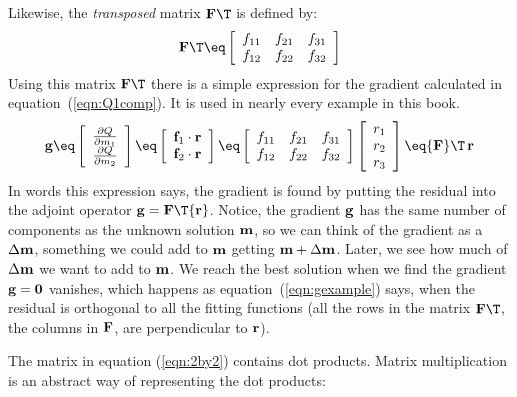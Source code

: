 Likewise, the {\it transposed} matrix $\bold F\T$ is defined by:
\begin{equation}
\bold F\T \eq
\left[ 
\begin{array}{ccc}
  f_{11} & f_{21} & f_{31}  \\
  f_{12} & f_{22} & f_{32}  \end{array} \right] 
\end{equation}
Using this matrix ${\bold F\T}$ there is a simple expression
for the gradient calculated in equation~(\ref{eqn:Q1comp}).
It is used in nearly every example in this book.
%
\begin{equation}
\bold g \eq 
\left[
\begin{array}{c}
\frac{\partial Q}{\partial m_1} \\
\frac{\partial Q}{\partial m_2}
\end{array}
\right]
\eq
\left[
\begin{array}{c}
{\bf f}_1 \cdot {\bf r} \\
{\bf f}_2 \cdot {\bf r}
\end{array}
\right]
\eq
\left[ 
\begin{array}{ccc}
  f_{11} & f_{21}  & f_{31} \\
  f_{12} & f_{22}  & f_{32}
 \end{array} \right] 
\left[
\begin{array}{c}
r_1 \\
r_2 \\
r_3
\end{array}
\right]
\eq
{\bf F}\T\,{\bf r}
\label{eqn:gexample}
\end{equation}
%
In words this expression says, the gradient is found by putting the
residual into the adjoint operator ${\bf g} = {\bf F}\T {\bf
  r}$. Notice, the gradient ${\bf g}$ has the same number of
components as the unknown solution ${\bf m}$, so we can think of the
gradient as a $\Delta {\bf m}$, something we could add to ${\bf m}$
getting ${\bf m}  + \Delta {\bf m}$.  Later, we see how much of
$\Delta {\bf m}$ we want to add to ${\bf m}$.  We reach the best
solution when we find the gradient ${\bf g} = {\bf 0}$ vanishes, which
happens as equation~(\ref{eqn:gexample}) says, when the residual is orthogonal to all the fitting functions (all the rows in the matrix ${\bf F}\T$, the columns in ${\bf F}$, are perpendicular  to ${\bf r}$). 
\par
The matrix in equation (\ref{eqn:2by2})
contains dot products.
Matrix multiplication is an abstract way of representing the dot products:
